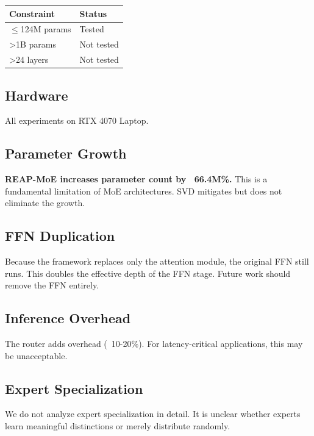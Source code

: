 \begin{table}[H]
\centering
\small
\begin{tabular}{ll}
\toprule
\textbf{Constraint} & \textbf{Status} \\
\midrule
$\le$124M params & Tested \\
\textgreater{}1B params & Not tested \\
\textgreater{}24 layers & Not tested \\
\bottomrule
\end{tabular}
\end{table}

\subsection{Hardware}

All experiments on RTX 4070 Laptop.

\subsection{Parameter Growth}

\textbf{REAP-MoE increases parameter count by ~66.4M\%.} This is a 
fundamental limitation of MoE architectures. SVD mitigates but does not 
eliminate the growth.

\subsection{FFN Duplication}

Because the framework replaces only the attention module, the original FFN 
still runs. This doubles the effective depth of the FFN stage. Future work 
should remove the FFN entirely.

\subsection{Inference Overhead}

The router adds overhead (~10-20\%). For latency-critical applications, this 
may be unacceptable.

\subsection{Expert Specialization}

We do not analyze expert specialization in detail. It is unclear whether 
experts learn meaningful distinctions or merely distribute randomly.

